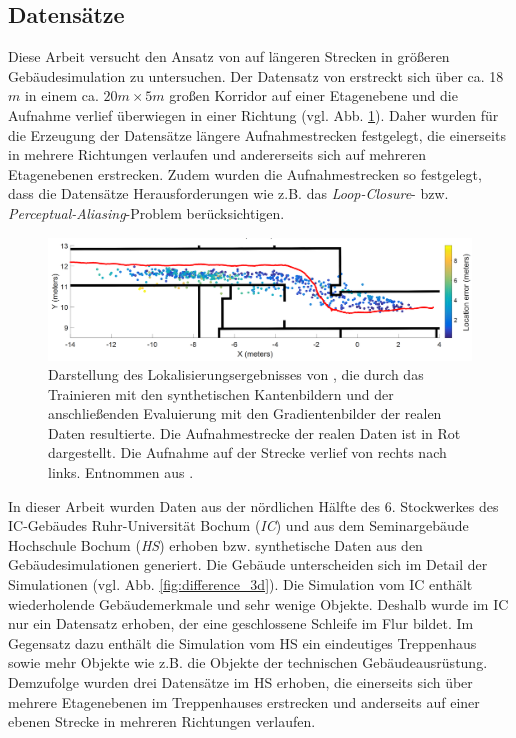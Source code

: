 \subsection{Datensätze}
\label{subsec:datasets}
Diese Arbeit versucht den Ansatz von \citet{acharyaBIMPoseNetIndoorCamera2019} auf längeren Strecken in größeren Gebäudesimulation zu untersuchen. Der Datensatz von \citet{acharyaBIMPoseNetIndoorCamera2019} erstreckt sich über ca. 18$m$ in einem ca. $20m \times 5m$ großen Korridor auf einer Etagenebene und die Aufnahme verlief überwiegen in einer Richtung (vgl. Abb. \ref{fig:acharya_traj}). Daher wurden für die Erzeugung der Datensätze längere Aufnahmestrecken festgelegt, die einerseits in mehrere Richtungen verlaufen und andererseits sich auf mehreren Etagenebenen erstrecken. Zudem wurden die Aufnahmestrecken so festgelegt, dass die Datensätze Herausforderungen wie z.B. das \textit{Loop-Closure}- bzw. \textit{Perceptual-Aliasing}-Problem berücksichtigen.

\begin{figure}
	\centering
	\includegraphics[width=1.0\textwidth]{images/trajectories/acharya_traj.png}
	\caption{Darstellung des Lokalisierungsergebnisses von \citet{acharyaBIMPoseNetIndoorCamera2019}, die durch das Trainieren mit den synthetischen Kantenbildern und der anschließenden Evaluierung mit den Gradientenbilder der realen Daten resultierte. Die Aufnahmestrecke der realen Daten ist in Rot dargestellt. Die Aufnahme auf der Strecke verlief von rechts nach links. Entnommen aus \cite{acharyaBIMPoseNetIndoorCamera2019}.}
	\label{fig:acharya_traj}
\end{figure}




In dieser Arbeit wurden Daten aus der nördlichen Hälfte des 6. Stockwerkes des IC-Gebäudes Ruhr-Universität Bochum (\textit{IC}) und aus dem Seminargebäude Hochschule Bochum (\textit{HS}) erhoben bzw. synthetische Daten aus den Gebäudesimulationen generiert. Die Gebäude unterscheiden sich im Detail der Simulationen (vgl.  Abb. \ref{fig:difference_3d}). Die Simulation vom IC enthält wiederholende Gebäudemerkmale und sehr wenige Objekte. Deshalb wurde im IC nur ein Datensatz erhoben, der eine geschlossene Schleife im Flur bildet. Im Gegensatz dazu enthält die Simulation vom HS ein eindeutiges Treppenhaus sowie mehr Objekte wie z.B. die Objekte der technischen Gebäudeausrüstung. Demzufolge wurden drei Datensätze im HS erhoben, die einerseits sich über mehrere Etagenebenen im Treppenhauses erstrecken und anderseits auf einer ebenen Strecke in mehreren Richtungen verlaufen.




